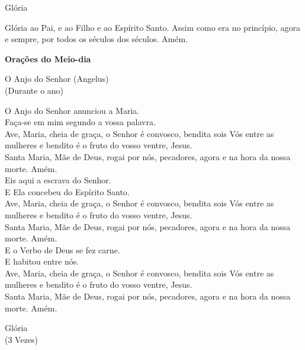 \documentclass{book}
\begin{document}
\begin{center}
    Glória
\end{center}
\begin{flushleft}
    Glória ao Pai, e ao Filho e ao Espírito Santo. Assim como era no princípio, agora e sempre, por todos os séculos dos séculos. Amém.
\end{flushleft}
\newpage
\begin{center}
    \textbf{Orações do Meio-dia}
\end{center}
\begin{center}
    O Anjo do Senhor (Angelus) \\ \textcolor{VioletRed2}{\scriptsize{(Durante o ano)}}
\end{center}
\begin{flushleft}
    \VbarRed{} O Anjo do Senhor anunciou a Maria. \\
    \RbarRed{} Faça-se em mim segundo a vossa palavra. \\
    \VbarRed{} Ave, Maria, cheia de graça, o Senhor é convosco, bendita sois Vós entre as mulheres e bendito é o fruto do vosso ventre, Jesus. \\
    \RbarRed{} Santa Maria, Mãe de Deus, rogai por nós, pecadores, agora e na hora da nossa morte. Amém. \\
    \hfill{} \break{}
    \VbarRed{} Eis aqui a escrava do Senhor. \\
    \RbarRed{} E Ela concebeu do Espírito Santo. \\
    \VbarRed{} Ave, Maria, cheia de graça, o Senhor é convosco, bendita sois Vós entre as mulheres e bendito é o fruto do vosso ventre, Jesus. \\
    \RbarRed{} Santa Maria, Mãe de Deus, rogai por nós, pecadores, agora e na hora da nossa morte. Amém. \\
    \hfill{} \break{}
    \VbarRed{} E o Verbo de Deus se fez carne. \\
    \RbarRed{} E habitou entre nós. \\
    \VbarRed{} Ave, Maria, cheia de graça, o Senhor é convosco, bendita sois Vós entre as mulheres e bendito é o fruto do vosso ventre, Jesus. \\
    \RbarRed{} Santa Maria, Mãe de Deus, rogai por nós, pecadores, agora e na hora da nossa morte. Amém.
\end{flushleft}
\begin{center}
    Glória \\ \textcolor{VioletRed2}{\scriptsize{(3 Vezes)}}
\end{center}
\end{document}
